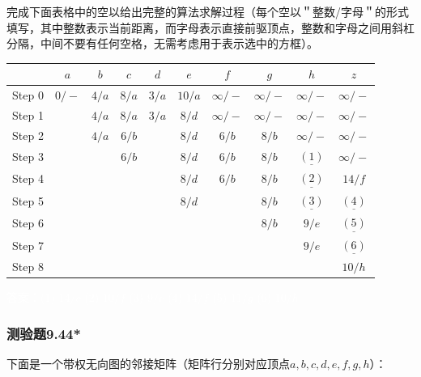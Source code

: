 \documentclass[UTF8, heading=true]{ctexart}
\begin{document}
完成下面表格中的空以给出完整的算法求解过程（每个空以＂整数/字母＂的形式填写，其中整数表示当前距离，而字母表示直接前驱顶点，整数和字母之间用斜杠分隔，中间不要有任何空格，无需考虑用于表示选中的方框）。

\begin{table}[H]
  \renewcommand{\arraystretch}{1.5}
  \centering
\begin{tabular}{c|c|c|c|c|c|c|c|c|c}
  \hline  & $a$ & $b$ & $c$ & $d$ & $e$ & $f$ & $g$ & $h$ & $z$ \\
  \hline Step  0 & $\boxed{0}/ -$ & $4/a$ & $8/a$ & $3 / a$ & $10 / a$ & $\infty /-$ & $\infty / -$ & $\infty /-$ & $\infty /-$ \\
  \hline Step  1 & & $4 / a$ & $8 / a$ & $\boxed{3} / a$ & $8 / d$ & $\infty /-$ & $\infty /-$ & $\infty /-$ & $\infty /-$ \\
  \hline Step  2 & & $\boxed{4}/a$ &$6/b$ & & $8 / d$ &$6/b$ & $8 / b$ & $\infty / -$ & $\infty / -$ \\
  \hline Step  3 & & & $\boxed{6}/b$ & & $8 / d$ & $6 / b$ & $8 / b$ & $\underline{(1)}$ & $\infty /-$ \\
  \hline Step  4 & & & & & $8 / d$ & $6 / b$ & $8 / b$ & $\underline{(2)}$ & $14 / f$ \\
  \hline Step  5 & & & & & $\boxed{8} / d$ & & $8 / b$ & $\underline{(3)}$ & $\underline{(4)}$ \\
  \hline Step  6 & & & & & & & $\boxed{8} / b$ & $9 / e$ & $\underline{(5)}$ \\
  \hline Step  7 & & & & & & & & $\boxed{9} / e$ & $\underline{(6)}$ \\
  \hline Step  8 & & & & & & & & & $\boxed{10} / h$ \\
  \hline
  \end{tabular}
\end{table}

\textcolor{white}{答案：(1) $14 / c$
(2) $10 / {f}$
(3) $9/e$
(4) $14 / {f}$
(5) $11 / {g}$
(6) $10 / {h}$}

\subsubsection{测验题9.44*}

下面是一个带权无向图的邻接矩阵（矩阵行分别对应顶点$a,b,c,d,e,f,g,h$）：
\end{document}
